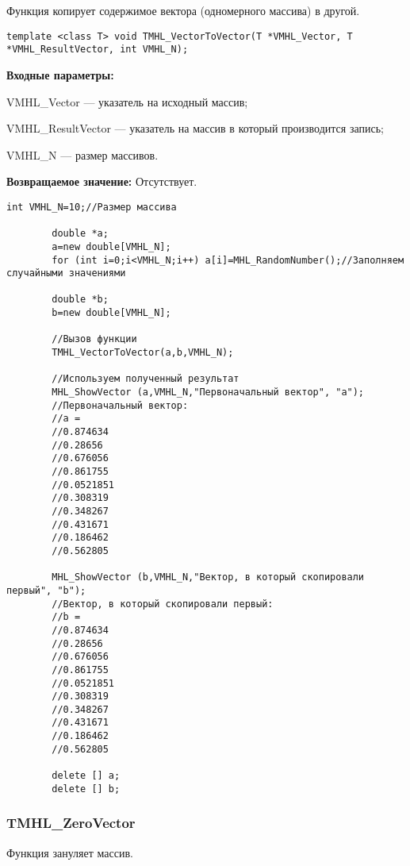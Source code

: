 \documentclass[a4paper,12pt]{article}
\begin{document}
Функция копирует содержимое вектора (одномерного массива) в другой.


\begin{lstlisting}[label=code_syntax_TMHL_VectorToVector,caption=Синтаксис]
template <class T> void TMHL_VectorToVector(T *VMHL_Vector, T *VMHL_ResultVector, int VMHL_N);
\end{lstlisting}

\textbf{Входные параметры:}

 VMHL\_Vector --- указатель на исходный массив;
 
 VMHL\_ResultVector --- указатель на массив в который производится запись;
 
 VMHL\_N --- размер массивов.

\textbf{Возвращаемое значение:}
Отсутствует.


\begin{lstlisting}[label=code_use_TMHL_VectorToVector,caption=Пример использования]
        int VMHL_N=10;//Размер массива

        double *a;
        a=new double[VMHL_N];
        for (int i=0;i<VMHL_N;i++) a[i]=MHL_RandomNumber();//Заполняем случайными значениями

        double *b;
        b=new double[VMHL_N];

        //Вызов функции
        TMHL_VectorToVector(a,b,VMHL_N);

        //Используем полученный результат
        MHL_ShowVector (a,VMHL_N,"Первоначальный вектор", "a");
        //Первоначальный вектор:
        //a =
        //0.874634
        //0.28656
        //0.676056
        //0.861755
        //0.0521851
        //0.308319
        //0.348267
        //0.431671
        //0.186462
        //0.562805

        MHL_ShowVector (b,VMHL_N,"Вектор, в который скопировали первый", "b");
        //Вектор, в который скопировали первый:
        //b =
        //0.874634
        //0.28656
        //0.676056
        //0.861755
        //0.0521851
        //0.308319
        //0.348267
        //0.431671
        //0.186462
        //0.562805

        delete [] a;
        delete [] b;
\end{lstlisting}

\subsubsection{TMHL\_ZeroVector}\label{TMHL_ZeroVector}

Функция зануляет массив.
\end{document}
